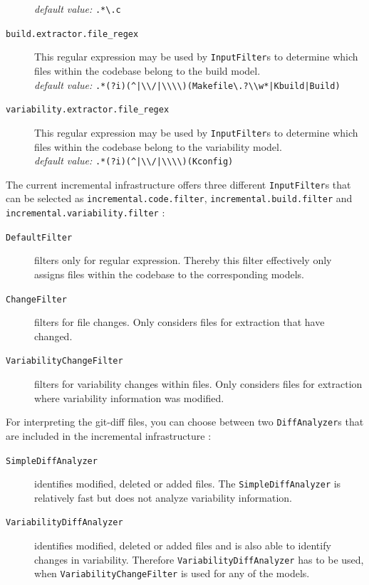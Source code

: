 \documentclass[a4paper]{article}
\begin{document}
\begin{description}
	    \emph{default value:} \lstinline[columns=fixed]{.*\.c}
	\item[\texttt{build.extractor.file\_regex}] This regular expression may be used by \texttt{Input\-Filter}s to determine which files within the codebase belong to the build model. \\
	    \emph{default value:} \lstinline[columns=fixed]{.*(?i)(^|\\/|\\\\)(Makefile\.?\\w*|Kbuild|Build)}
	\item[\texttt{variability.extractor.file\_regex}] This regular expression may be used by \texttt{InputFilter}s to determine which files within the codebase belong to the variability model.  \\
	\emph{default value:} \lstinline[columns=fixed]{.*(?i)(^|\\/|\\\\)(Kconfig)}
\end{description}

The current incremental infrastructure offers three different \texttt{InputFilter}s that can be selected as \texttt{incremental.code.filter}, \texttt{incremental.build.filter} and \texttt{incremental.variability.filter} :

\begin{description}
	\item[\texttt{DefaultFilter}] filters only for regular expression. Thereby this filter effectively only assigns files within the codebase to the corresponding models.
	\item[\texttt{ChangeFilter}] filters for file changes. Only considers files for extraction that have changed.
	\item[\texttt{VariabilityChangeFilter}] filters for variability changes within files. Only considers files for extraction where variability information was modified.
\end{description}

For interpreting the git-diff files, you can choose between two \texttt{DiffAnalyzer}s that are included in the incremental infrastructure :

\begin{description}
	\item[\texttt{SimpleDiffAnalyzer}] identifies modified, deleted or added files. The \texttt{Simple\-Diff\-Analyzer} is relatively fast but does not analyze variability information.
	\item[\texttt{VariabilityDiffAnalyzer}] identifies modified, deleted or added files and is also able to identify changes in variability. Therefore \texttt{Variability\-Diff\-Analyzer} has to be used, when \texttt{VariabilityChangeFilter} is used for any of the models.
\end{description}
\end{document}
